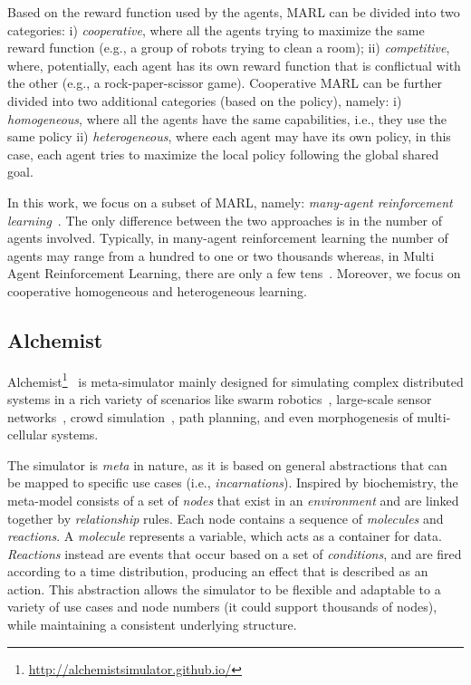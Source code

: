 Based on the reward function used by the agents, MARL can be divided into two categories:
 i) \emph{cooperative}, where all the agents trying to maximize the same reward function (e.g., a group of robots trying to clean a room);
 ii) \emph{competitive}, where, potentially, each agent has its own reward function that is conflictual with the other (e.g., a rock-paper-scissor game).
 Cooperative MARL can be further divided into two additional categories (based on the policy),
 namely:
 i) \emph{homogeneous}, where all the agents have the same capabilities, i.e., they use the same policy
 ii) \emph{heterogeneous}, where each agent may have its own policy, in this case, each agent 
    tries to maximize the local policy following the global shared goal.   

In this work, we focus on a subset of MARL, namely: \emph{many-agent reinforcement learning}~\cite{yang2021many}. 
 The only difference between the two approaches is in the number of agents involved. Typically, in many-agent reinforcement learning the number of agents
 may range from a hundred to one or two thousands whereas, in Multi Agent Reinforcement Learning, there are only a few tens~\cite{smac,marl-curricula}.
 Moreover, we focus on cooperative homogeneous and heterogeneous learning.

\subsection{Alchemist}\label{coordination2023:alchemist}

Alchemist\footnote{\url{http://alchemistsimulator.github.io/}}~\cite{DBLP:journals/jos/PianiniMV13} is meta-simulator
 mainly designed for simulating complex distributed systems 
 in a rich variety of scenarios like swarm robotics~\cite{Casadei2021},
 large-scale sensor networks~\cite{Aguzzi_2022}, crowd simulation~\cite{Beal2015},
 path planning, and even morphogenesis of multi-cellular systems.

The simulator is \emph{meta} in nature, 
 as it is based on general abstractions 
 that can be mapped to specific use cases (i.e., \emph{incarnations}).
% 
Inspired by biochemistry, 
 the meta-model consists of a set of \emph{nodes} 
 that exist in an \emph{environment} and are linked together by \emph{relationship} rules. 
 Each node contains a sequence of \emph{molecules} and \emph{reactions}. 
%
 A \emph{molecule} represents a variable, 
 which acts as a container for data. 
 \emph{Reactions} instead are events that occur based 
 on a set of \emph{conditions}, 
 and are fired according to a time distribution, 
 producing an effect that is described as an action. 
This abstraction allows the simulator to be flexible 
 and adaptable to a variety of use cases and node numbers 
 (it could support thousands of nodes), 
 while maintaining a consistent underlying structure.

